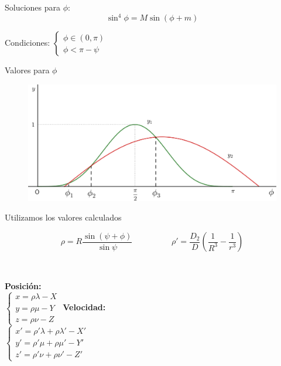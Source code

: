 \documentclass{beamer}
\newcommand\ddfrac[2]{\frac{\displaystyle #1}{\displaystyle #2}}
\begin{document}
\begin{frame}
Soluciones para $\phi$:
\[
\sin^4{\phi}=M\sin{(\phi + m)}
\]
\vspace{0.6666cm}
\pause

Condiciones: \hspace{0.5cm}
$
\left\{
\begin{array}{l}
\phi\in(0,\pi)\\
\phi<\pi-\psi
\end{array}
\right.
$
\end{frame}

\begin{frame}{Valores para $\phi$}
\begin{figure}[H]
\centering
\includegraphics[scale=0.1]{images/phi_solution_m_negative_M_near_1.png}
\end{figure}

\end{frame}

\begin{frame}{Utilizamos los valores calculados}


\[\rho=R\ddfrac{\sin{(\psi+\phi)}}{\sin{\psi}}
\hspace{2cm}
\rho'=\ddfrac{D_2}{D}\left(\ddfrac{1}{R^3}-\ddfrac{1}{r^3}\right)\]\\
\vspace{1cm}

\pause
\begin{columns}
\textbf{Posición:}\\
\vspace{0.4cm}
$
\left\{
\begin{array}{l}
	x=\rho\lambda-X\\
	y=\rho\mu-Y\\
	z=\rho\nu-Z
\end{array}
\right.
$
\textbf{Velocidad:}\\
\vspace{0.4cm}
$
\left\{
\begin{array}{l}
	x'=\rho'\lambda+\rho\lambda'-X'\\
	y'=\rho'\mu+\rho\mu'-Y'\\
	z'=\rho'\nu+\rho\nu'-Z'
\end{array}
\right.
$
\end{columns}
\end{frame}
\end{document}
